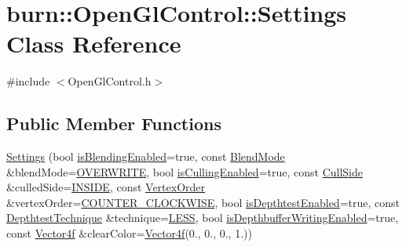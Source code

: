 \hypertarget{classburn_1_1_open_gl_control_1_1_settings}{\section{burn\-:\-:Open\-Gl\-Control\-:\-:Settings Class Reference}
\label{classburn_1_1_open_gl_control_1_1_settings}
}


{\ttfamily \#include $<$Open\-Gl\-Control.\-h$>$}

\subsection*{Public Member Functions}
\begin{DoxyCompactItemize}
\item 
\hyperlink{classburn_1_1_open_gl_control_1_1_settings_ac8e6ac7ffee225fbce157dd3d7ce851d}{Settings} (bool \hyperlink{classburn_1_1_open_gl_control_1_1_settings_a31424767c7990ddb3bab81a0c07112da}{is\-Blending\-Enabled}=true, const \hyperlink{classburn_1_1_open_gl_control_a2b90956aa23e041f3568234986641ba6}{Blend\-Mode} \&blend\-Mode=\hyperlink{classburn_1_1_open_gl_control_a2b90956aa23e041f3568234986641ba6ac6c8551e054abab3e0a5c554f7d4d9b6}{O\-V\-E\-R\-W\-R\-I\-T\-E}, bool \hyperlink{classburn_1_1_open_gl_control_1_1_settings_ae658f9b1d31076e2d3dee854e2a2364f}{is\-Culling\-Enabled}=true, const \hyperlink{classburn_1_1_open_gl_control_a60b866f2c1b2b210e618c39ef72f556b}{Cull\-Side} \&culled\-Side=\hyperlink{classburn_1_1_open_gl_control_a60b866f2c1b2b210e618c39ef72f556bad94f67ed661cb3c5d4d26b9429a1a28f}{I\-N\-S\-I\-D\-E}, const \hyperlink{classburn_1_1_open_gl_control_a1df746e6b8ad5c42abcfd607ef514aba}{Vertex\-Order} \&vertex\-Order=\hyperlink{classburn_1_1_open_gl_control_a1df746e6b8ad5c42abcfd607ef514abaacfe59361eeab1b7180020608a837b126}{C\-O\-U\-N\-T\-E\-R\-\_\-\-C\-L\-O\-C\-K\-W\-I\-S\-E}, bool \hyperlink{classburn_1_1_open_gl_control_1_1_settings_afc53b39d703edbc692599f9deb2a038f}{is\-Depthtest\-Enabled}=true, const \hyperlink{classburn_1_1_open_gl_control_a6435b1cdb4d2c72085a19bb77be9d845}{Depthtest\-Technique} \&technique=\hyperlink{classburn_1_1_open_gl_control_a6435b1cdb4d2c72085a19bb77be9d845a4755df5af722a2e650145662ecd8cedd}{L\-E\-S\-S}, bool \hyperlink{classburn_1_1_open_gl_control_1_1_settings_a81423f51754063178cb5c73247150e97}{is\-Depthbuffer\-Writing\-Enabled}=true, const \hyperlink{namespaceburn_a58a411b9d83c7970518a9250c1c78068}{Vector4f} \&clear\-Color=\hyperlink{namespaceburn_a58a411b9d83c7970518a9250c1c78068}{Vector4f}(0., 0., 0., 1.))

\end{DoxyCompactItemize}
